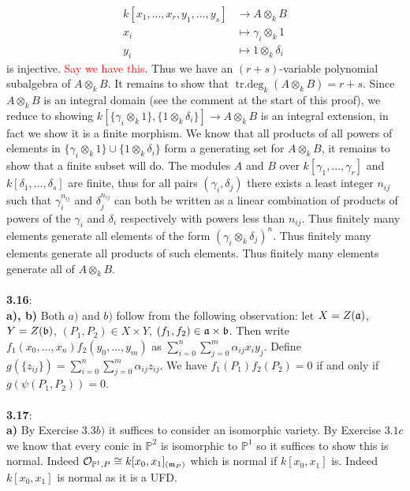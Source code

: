 \documentclass[12pt]{article}
\numberwithin{thm}{subsection}
\numberwithin{defn}{subsection}
\numberwithin{lemma}{subsection}
\numberwithin{example}{subsection}
\numberwithin{notation}{subsection}
\numberwithin{cor}{subsection}
\numberwithin{remark}{subsection}
\numberwithin{condition}{subsection}
\numberwithin{question}{subsection}
\numberwithin{construction}{subsection}
\numberwithin{construction}{subsection}
\numberwithin{construction}{subsection}
\newcommand{\bb}[1]{\mathbb{#1}}
\newcommand{\call}[1]{\mathcal{#1}}
\newcommand{\lto}{\longrightarrow}
\begin{document}
\begin{align*}
    k[x_1,...,x_r,y_1,...,y_s] &\lto A\otimes_k B\\
    x_i &\mapsto \gamma_i \otimes_k 1\\
    y_i &\mapsto 1 \otimes_k \delta_i
\end{align*}
is injective. \textcolor{red}{Say we have this}. Thus we have an $(r + s)$-variable polynomial subalgebra of $A\otimes_k B$. It remains to show that $\operatorname{tr.deg}_k(A\otimes_kB) = r + s$. Since $A\otimes_k B$ is an integral domain (see the comment at the start of this proof), we reduce to showing $k[\lbrace \gamma_i \otimes_k 1\rbrace, \lbrace 1 \otimes_k \delta_i\rbrace]\lto A\otimes_k B$ is an integral extension, in fact we show it is a finite morphism. We know that all products of all powers of elements in $\lbrace \gamma_i \otimes_k 1\rbrace \cup \lbrace 1 \otimes_k \delta_i\rbrace$ form a generating set for $A\otimes_k B$, it remains to show that a finite subset will do. The modules $A$ and $B$ over $k[\gamma_1,...,\gamma_r]$ and $k[\delta_1,...,\delta_s]$ are finite, thus for all pairs $(\gamma_i, \delta_j)$ there exists a least integer $n_{ij}$ such that $\gamma_i^{n_{ij}}$ and $\delta_j^{n_{ij}}$ can both be written as a linear combination of products of powers of the $\gamma_i$ and $\delta_i$ respectively with powers less than $n_{ij}$. Thus finitely many elements generate all elements of the form $(\gamma_i \otimes_k \delta_j)^n$. Thus finitely many elements generate all products of such elements. Thus finitely many elements generate all of $A \otimes_k B$.\\\\
%
\textbf{3.16}:\\
%
\textbf{a), b)} Both $a)$ and $b)$ follow from the following observation: let $X = Z(\frak{a})$, $Y = Z(\frak{b})$, $(P_1,P_2) \in X \times Y$, $(f_1, f_2) \in \frak{a} \times \frak{b}$. Then write $f_1(x_0,...,x_n)f_2(y_0,...,y_m)$ as $\sum_{i = 0}^n\sum_{j = 0}^m \alpha_{ij}x_iy_j$. Define $g(\lbrace z_{ij}\rbrace) = \sum_{i = 0}^n\sum_{j = 0}^m \alpha_{ij}z_{ij}$. We have $f_1(P_1)f_2(P_2) = 0$ if and only if $g(\psi(P_1,P_2)) = 0$.\\\\
%
\textbf{3.17}:\\
\textbf{a)} By Exercise $3.3b)$ it suffices to consider an isomorphic variety. By Exercise $3.1c$ we know that every conic in $\bb{P}^2$ is isomorphic to $\bb{P}^1$ so it suffices to show this is normal. Indeed $\call{O}_{\bb{P}^1,P} \cong k[x_0,x_1]_{(\frak{m}_P)}$ which is normal if $k[x_0,x_1]$ is. Indeed $k[x_0,x_1]$ is normal as it is a UFD.\\\\
\end{document}
